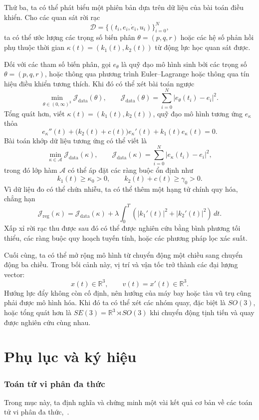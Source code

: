﻿\documentclass[12pt]{article}
\begin{document}
Thứ ba, ta có thể phát biểu một phiên bản dựa trên dữ liệu của bài toán điều khiển.
Cho các quan sát rời rạc
\[
 \mathcal D
 =
 \{(t_i, e_i,\dot e_i, u_i)\}_{i = 0}^{N},
\]
ta có thể ước lượng các trọng số biến phân
$\theta = (p, q, r)$ hoặc các hệ số phản hồi phụ thuộc thời gian $\kappa(t) = (k_1(t), k_2(t))$ từ động lực học quan sát được.

Đối với các tham số biến phân, gọi $e_\theta$ là quỹ đạo mô hình sinh bởi các trọng số $\theta=(p,q,r)$, hoặc thông qua phương trình Euler--Lagrange hoặc thông qua tín hiệu điều khiển tương thích.
Khi đó có thể xét bài toán ngược
\[
 \min_{\theta \in (0, \infty)^3}
 \mathcal J_{\mathrm{data}}(\theta),
 \qquad
 \mathcal J_{\mathrm{data}}(\theta)
 =
 \sum_{i = 0}^{N}
 \left|e_\theta(t_i) - e_i\right|^2.
\]
Tổng quát hơn, viết $\kappa(t)=(k_1(t),k_2(t))$, quỹ đạo mô hình tương ứng $e_\kappa$ thỏa
\[
 e_\kappa''(t)
 +
 \bigl(k_2(t) + c(t)\bigr)e_\kappa'(t)
 +
 k_1(t)e_\kappa(t)
 =
 0.
\]
Bài toán khớp dữ liệu tương ứng có thể viết là
\[
 \min_{\kappa \in \mathcal A}
 \mathcal J_{\mathrm{data}}(\kappa),
 \qquad
 \mathcal J_{\mathrm{data}}(\kappa)
 =
 \sum_{i = 0}^{N}
 \left|e_\kappa(t_i) - e_i\right|^2,
\]
trong đó lớp hàm $\mathcal A$ có thể áp đặt các ràng buộc ổn định như
\[
 k_1(t) \geq \kappa_0 > 0,
 \qquad
 k_2(t) + c(t) \geq \gamma_0 > 0.
\]
Vì dữ liệu đo có thể chứa nhiễu, ta có thể thêm một hạng tử chính quy hóa, chẳng hạn
\[
 \mathcal J_{\mathrm{reg}}(\kappa)
 =
 \mathcal J_{\mathrm{data}}(\kappa)
 +
 \lambda \int_0^T
 \left(|k_1'(t)|^2 + |k_2'(t)|^2\right)\, dt.
\]
Xấp xỉ rời rạc thu được sau đó có thể được nghiên cứu bằng bình phương tối thiểu, các ràng buộc quy hoạch tuyến tính, hoặc các phương pháp lọc xác suất.

Cuối cùng, ta có thể mở rộng mô hình từ chuyển động một chiều sang chuyển động ba chiều.
Trong bối cảnh này, vị trí và vận tốc trở thành các đại lượng vector:
\[
 x(t) \in \mathbb R^3,
 \qquad
 v(t) = x'(t) \in \mathbb R^3.
\]
Hướng lực đẩy không còn cố định, nên hướng của máy bay hoặc tàu vũ trụ cũng phải được mô hình hóa. Khi đó ta có thể xét các nhóm quay, đặc biệt là
$SO(3)$, hoặc tổng quát hơn là $SE(3) = \mathbb R^3\rtimes SO(3)$ khi chuyển động tịnh tiến và quay được nghiên cứu cùng nhau.

\part{Phụ lục và ký hiệu}

\appendix
\section{Toán tử vi phân đa thức}\label{appendix:operator-algebra}
Trong mục này, ta định nghĩa và chứng minh một vài kết quả cơ bản về các toán tử vi phân đa thức,~\cite{le_van_luyen_la1a}.
\end{document}
